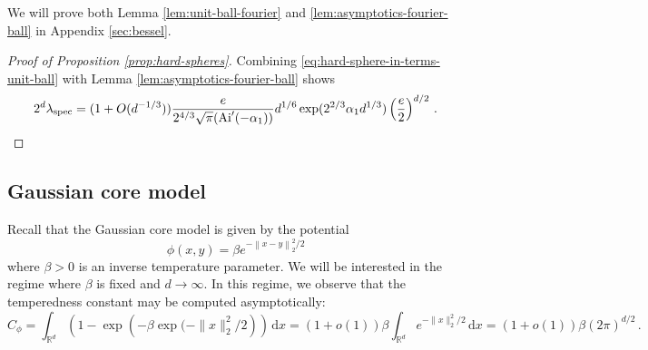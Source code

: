 \documentclass[10pt]{amsart}
\theoremstyle{definition}
\theoremstyle{remark}
\newcommand{\spec}{{\mathrm{spec}}}
\newcommand{\R}{\mathbb{R}}
\newcommand{\diff}{\mathrm{d}}
\begin{document}
	We will prove both Lemma \ref{lem:unit-ball-fourier} and \ref{lem:asymptotics-fourier-ball} in Appendix \ref{sec:bessel}.
	\begin{proof}[Proof of Proposition \ref{prop:hard-spheres}]
		Combining \eqref{eq:hard-sphere-in-terms-unit-ball} with Lemma \ref{lem:asymptotics-fourier-ball} shows \begin{equation}\label{eq:hard-sphere-lambda-spec-asympt}
			2^d \lambda_\spec = (1 + O(d^{-1/3}))  \frac{e}{2^{4/3} \sqrt{\pi} (\mathrm{Ai}'(-\alpha_1))} d^{1/6} \exp(2^{2/3} \alpha_1 d^{1/3}) \left(\frac{e}{2} \right)^{d/2} \,. \qedhere
		\end{equation}
	\end{proof}
	
	
	
	
	
	
	\subsection{Gaussian core model}
	
	Recall that the Gaussian core model is given by the potential \begin{equation}\label{eq:gaussian-core}
		\phi(x,y) = \beta e^{- \left\| x - y \right\|_2^2 / 2}
	\end{equation}
	where $\beta > 0$ is an inverse temperature parameter.  We will be  interested in the regime where $\beta$ is fixed and $d \to \infty$.  In this regime, we observe that the temperedness constant may be computed asymptotically: \begin{equation}\label{eq:temperedness-GCM}
		C_\phi = \int_{\R^d} (1 - \exp\left(-\beta \exp(- \|x\|_2^2 / 2 \right))\,\diff x = (1 + o(1)) \beta \int_{\R^d} e^{-\|x\|_2^2 / 2}\,\diff x = (1 + o(1))\beta (2\pi)^{d/2}\,.\end{equation}
	
\end{document}

